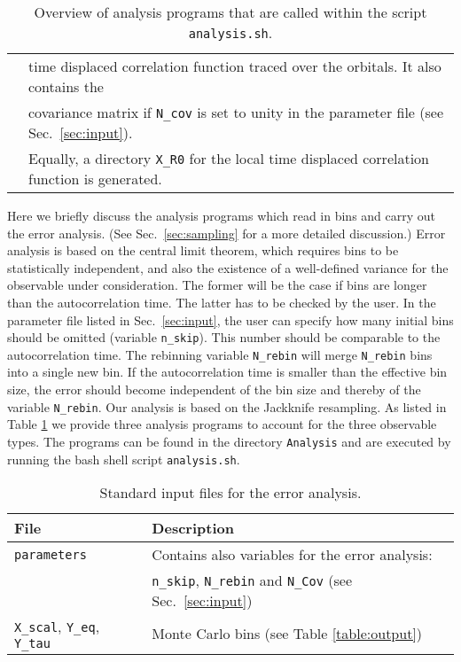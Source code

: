 \begin{table}[h]
\begin{tabular}{@{} l l @{}}
                           & time displaced correlation function traced over the  orbitals.  It also contains the  \\
                           & covariance matrix if \texttt{N\_cov} is set to unity in the parameter file  (see Sec.~\ref{sec:input}). \\
                           & Equally, a directory  \texttt{X\_R0}  for the local  time displaced  correlation function is generated. \\\bottomrule
   \end{tabular}
   \caption{ Overview of analysis programs that are called within the script \texttt{analysis.sh}. \label{table:analysis_programs}}
\end{table}
%
Here we briefly   discuss the analysis programs which read in bins and carry out the error analysis. (See Sec.~\ref{sec:sampling}  for a more detailed discussion.)
Error analysis   is based  on the central limit theorem,  which requires bins to be statistically independent, and also the existence of a well-defined variance  for the observable under consideration. 
The former will be the case if bins are  longer than the autocorrelation time.  The latter has to be checked by the user.  In the parameter file listed in Sec.~\ref{sec:input}, the user  can specify how many initial bins should be omitted (variable \texttt{n\_skip}). 
This  number should be comparable to the autocorrelation time.     
The  rebinning  variable \texttt{N\_rebin} will merge \texttt{N\_rebin}  bins into a single new bin. 
If the autocorrelation time  is smaller than the effective bin size, the error should become independent of the bin size and thereby of the variable \texttt{N\_rebin}.  
Our analysis is based on the Jackknife resampling\cite{efron1981}.
As listed in Table  \ref{table:analysis_programs}  we provide three analysis programs to account for the three observable types. The programs can be found in the directory \texttt{Analysis}  and   are executed by running the  bash shell script 
\texttt{analysis.sh}.
%
\begin{table}[h]
   \begin{tabular}{@{} l l @{}}\toprule
   File & Description \\\midrule
   \texttt{parameters}  &  Contains also variables for the error analysis:\\
   & \texttt{n\_skip}, \texttt{N\_rebin} and \texttt{N\_Cov} (see Sec.~\ref{sec:input}) \\
   \texttt{X\_scal}, \texttt{Y\_eq}, \texttt{Y\_tau} & Monte Carlo bins (see Table \ref{table:output}) \\\bottomrule
    \end{tabular}
   \caption{Standard input files for the error analysis. \label{table:analysis_input}}
\end{table}
